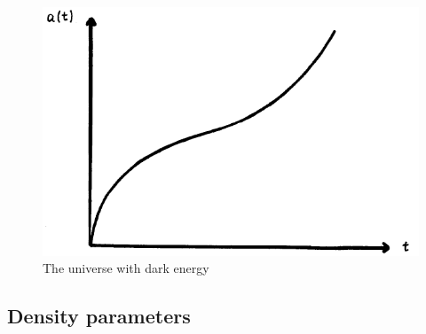 \documentclass[11pt, a4paper,oneside,openright]{book}
\numberwithin{equation}{section}
\begin{document}
\begin{figure}[ht]
\begin{center}
\includegraphics[scale=0.5]{Draw/lec6_4.png}
\end{center}
\caption{The universe with dark energy}
\label{fig:lec6_4}
\end{figure}

\subsection{Density parameters}
\end{document}
